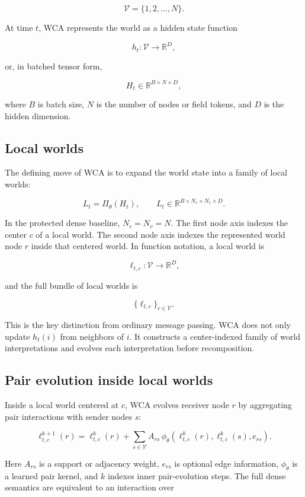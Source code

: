 \documentclass[11pt]{article}
\newcommand{\R}{\mathbb{R}}
\newcommand{\V}{\mathcal{V}}
\begin{document}
\[
\V = \{1,2,\ldots,N\}.
\]

At time $t$, WCA represents the world as a hidden state function

\[
h_t:\V \rightarrow \R^D,
\]

or, in batched tensor form,

\[
H_t \in \R^{B \times N \times D},
\]

where $B$ is batch size, $N$ is the number of nodes or field tokens, and $D$ is
the hidden dimension.

\subsection{Local worlds}

The defining move of WCA is to expand the world state into a family of local
worlds:

\[
L_t = \Pi_\theta(H_t), \qquad
L_t \in \R^{B \times N_c \times N_v \times D}.
\]

In the protected dense baseline, $N_c=N_v=N$. The first node axis indexes the
center $c$ of a local world. The second node axis indexes the represented world
node $r$ inside that centered world. In function notation, a local world is

\[
\ell_{t,c}: \V \rightarrow \R^D,
\]

and the full bundle of local worlds is

\[
\{\ell_{t,c}\}_{c\in \V}.
\]

This is the key distinction from ordinary message passing. WCA does not only
update $h_t(i)$ from neighbors of $i$. It constructs a center-indexed family of
world interpretations and evolves each interpretation before recomposition.

\subsection{Pair evolution inside local worlds}

Inside a local world centered at $c$, WCA evolves receiver node $r$ by
aggregating pair interactions with sender nodes $s$:

\[
\ell^{k+1}_{t,c}(r)
=
\ell^{k}_{t,c}(r)
+
\sum_{s\in \V}
A_{rs}\,
\phi_\theta
\left(
\ell^{k}_{t,c}(r),
\ell^{k}_{t,c}(s),
e_{rs}
\right).
\]

Here $A_{rs}$ is a support or adjacency weight, $e_{rs}$ is optional edge
information, $\phi_\theta$ is a learned pair kernel, and $k$ indexes inner
pair-evolution steps. The full dense semantics are equivalent to an interaction
over
\end{document}
